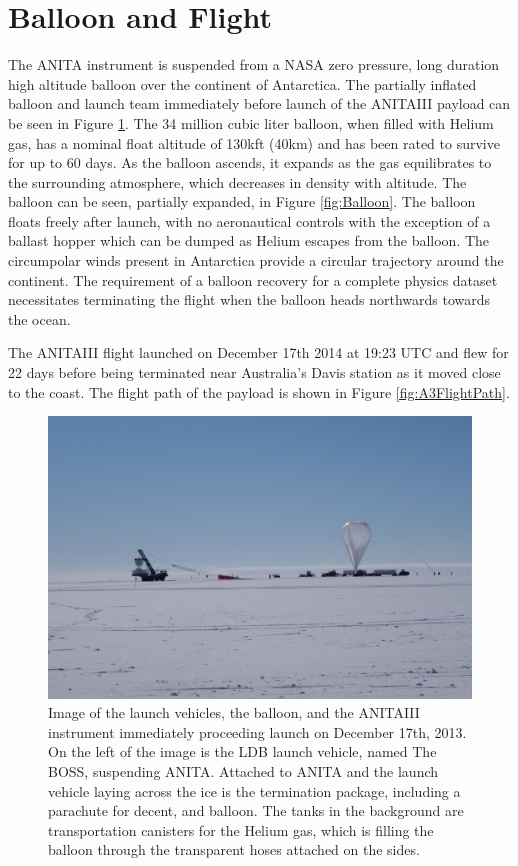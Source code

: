 \section{Balloon and Flight}
		The ANITA instrument is suspended from a NASA zero pressure, long duration high altitude balloon over the continent of Antarctica.  The partially inflated balloon and launch team immediately before launch of the ANITAIII payload can be seen in Figure \ref{fig:Launch}.  The 34 million cubic liter balloon, when filled with Helium gas, has a nominal float altitude of 130kft (40km) and has been rated to survive for up to 60 days.  As the balloon ascends, it expands as the gas equilibrates to the surrounding atmosphere, which decreases in density with altitude. The balloon can be seen, partially expanded, in Figure \ref{fig:Balloon}.  The balloon floats freely after launch, with no aeronautical controls with the exception of a ballast hopper which can be dumped as Helium escapes from the balloon. The circumpolar winds present in Antarctica provide a circular trajectory around the continent.  The requirement of a balloon recovery for a complete physics dataset necessitates terminating the flight when the balloon heads northwards towards the ocean.  
		
		The ANITAIII flight launched on December 17th 2014 at 19:23 UTC and flew for 22 days before being terminated near Australia's Davis station as it moved close to the coast.  The flight path of the payload is shown in Figure \ref{fig:A3FlightPath}.

\begin{figure}
\centering
	\includegraphics[width=\textwidth]{figures/Launch}
	\caption{Image of the launch vehicles, the balloon, and the ANITAIII instrument immediately proceeding launch on December 17th, 2013.  On the left of the image is the LDB launch vehicle, named The BOSS, suspending ANITA.  Attached to ANITA and the launch vehicle laying across the ice is the termination package, including a parachute for decent, and balloon.  The tanks in the background are transportation canisters for the Helium gas, which is filling the balloon through the transparent hoses attached on the sides.}
	\label{fig:Launch}
\end{figure}
			
